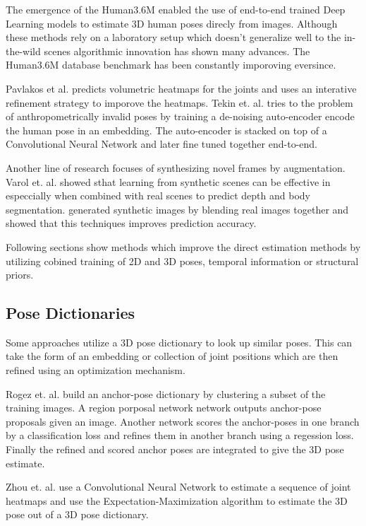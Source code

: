 The emergence of the Human3.6M \parencite{ionescu2014human3} enabled the use of end-to-end trained Deep Learning models to estimate 3D human poses direcly from images. Although these methods rely on a laboratory setup which doesn't generalize well to the in-the-wild scenes algorithmic innovation has shown many advances. The Human3.6M database benchmark has been constantly imporoving eversince.

Pavlakos et al. \parencite{pavlakos2017coarse} predicts volumetric heatmaps for the joints and uses an interative refinement strategy to imporove the heatmaps. Tekin et. al. \parencite{tekin2016structured} tries to the problem of anthropometrically invalid poses by training a de-noising auto-encoder encode the human pose in an embedding. The auto-encoder is stacked on top of a Convolutional Neural Network and later fine tuned together end-to-end.

Another line of research focuses of synthesizing novel frames by augmentation. Varol et. al. \parencite{varol2017learning}showed sthat learning from synthetic scenes can be effective in especcially when combined with real scenes to predict depth and body segmentation. \parencite{rogez2016mocap} generated synthetic images by blending real images  together and showed that this techniques improves prediction accuracy.

Following sections show methods which improve the direct estimation methods by utilizing cobined training of 2D and 3D poses, temporal information or structural priors.

\subsection{Pose Dictionaries}

Some approaches utilize a 3D pose dictionary to look up similar poses. This can take the form of an embedding or collection of joint positions which are then refined using an optimization mechanism.

Rogez et. al. \parencite{rogez2017lcr} build an anchor-pose dictionary by clustering a subset of the training images. A region porposal network \parencite{ren2015faster} network outputs anchor-pose proposals given an image. Another network scores the anchor-poses in one branch by a classification loss and refines them in another branch using a regession loss. Finally the refined and scored anchor poses are integrated to give the 3D pose estimate.

Zhou et. al. \parencite{zhou2016sparseness} use a Convolutional Neural Network to estimate a sequence of joint heatmaps and use the Expectation-Maximization algorithm to estimate the 3D pose out of a 3D pose dictionary. 

